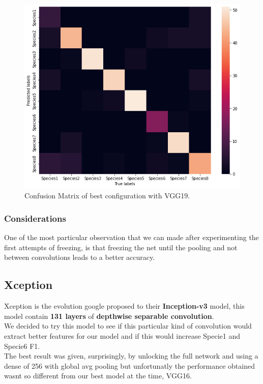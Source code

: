 \documentclass[10pt]{article}
\begin{document}
\begin{figure}[ht]
\begin{center}
\centerline{\includegraphics[width=\columnwidth]{VGG19_best}}
\caption{Confusion Matrix of best configuration with VGG19.}
\label{bayespic}
\end{center}
\end{figure}
\subsubsection{Considerations}
One of the most particular observation that we can made after experimenting the first attempts of freezing, is that freezing the net
until the pooling and not between convolutions leads to a better accuracy.

\subsection{Xception}
Xception is the evolution google proposed to their \textbf{Inception-v3} model, this model contain \textbf{131 layers} of \textbf{depthwise separable convolution}.\\
We decided to try this model to see if this particular kind of convolution would extract better features for our model and if this would increase Specie1 and Specie6 F1.\\
The best result was given, surprisingly, by unlocking the full network and using a dense of 256 with global avg pooling but
unfortunatly the performance obtained wasnt so different from our best model at the time, VGG16.
\end{document}
